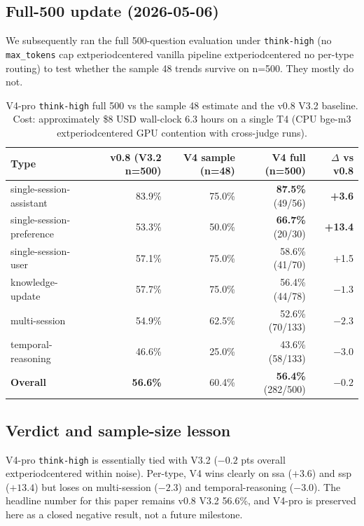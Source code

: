 \subsection{Full-500 update (2026-05-06)}
\label{app:v4-full500}

We subsequently ran the full 500-question evaluation under
\texttt{think-high} (no \texttt{max\_tokens} cap 	extperiodcentered{}  vanilla pipeline 	extperiodcentered{} 
no per-type routing) to test whether the sample 48 trends survive on
n=500. They mostly do not.

\begin{table}[h]
\centering
\small
\begin{tabular}{lrrrr}
\toprule
\textbf{Type} & \textbf{v0.8 (V3.2 n=500)} & \textbf{V4 sample (n=48)} & \textbf{V4 full (n=500)} & \textbf{\(\Delta\) vs v0.8} \\
\midrule
single-session-assistant  & 83.9\% & 75.0\% & \textbf{87.5\%} (49/56) & \textbf{+3.6} \\
single-session-preference & 53.3\% & 50.0\% & \textbf{66.7\%} (20/30) & \textbf{+13.4} \\
single-session-user       & 57.1\% & 75.0\% & 58.6\% (41/70)  & +1.5 \\
knowledge-update          & 57.7\% & 75.0\% & 56.4\% (44/78)  & \(-1.3\) \\
multi-session             & 54.9\% & 62.5\% & 52.6\% (70/133) & \(-2.3\) \\
temporal-reasoning        & 46.6\% & 25.0\% & 43.6\% (58/133) & \(-3.0\) \\
\midrule
\textbf{Overall}          & \textbf{56.6\%} & 60.4\% & \textbf{56.4\%} (282/500) & \(-0.2\) \\
\bottomrule
\end{tabular}
\caption{V4-pro \texttt{think-high} full 500 vs the sample 48 estimate
and the v0.8 V3.2 baseline. Cost: approximately \$8 USD wall-clock 6.3
hours on a single T4 (CPU bge-m3 	extperiodcentered{}  GPU contention with cross-judge
runs).}
\label{tab:v4-full500}
\end{table}

\subsection{Verdict and sample-size lesson}
\label{app:v4-verdict}

V4-pro \texttt{think-high} is essentially tied with V3.2
(\(-0.2\) pts overall 	extperiodcentered{}  within noise). Per-type, V4 wins clearly on
ssa (\(+3.6\)) and ssp (\(+13.4\)) but loses on multi-session
(\(-2.3\)) and temporal-reasoning (\(-3.0\)). The headline number for
this paper remains v0.8 V3.2 56.6\%, and V4-pro is preserved here as
a closed negative result, not a future milestone.

